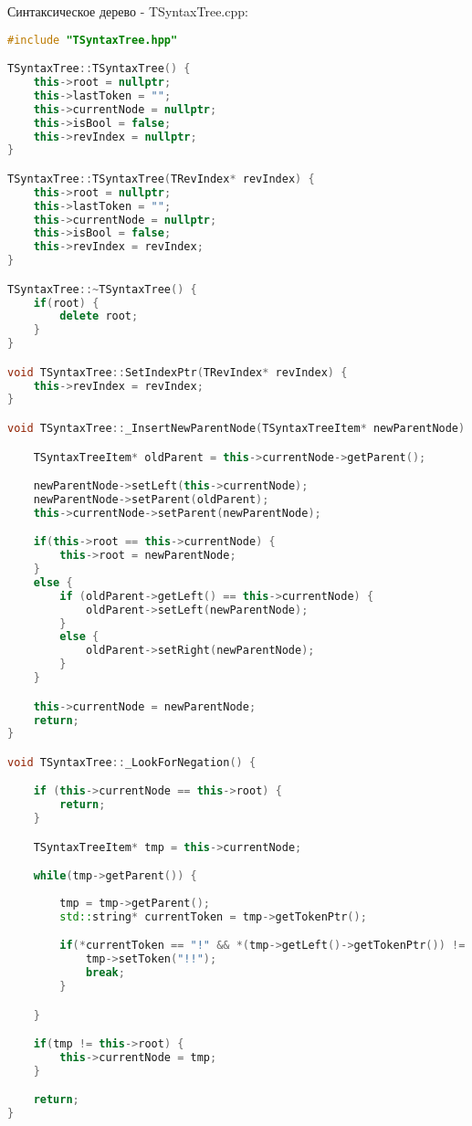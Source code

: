 Синтаксическое дерево - TSyntaxTree.cpp:
\begin{lstlisting}[language=C++]
#include "TSyntaxTree.hpp"

TSyntaxTree::TSyntaxTree() {
    this->root = nullptr;
    this->lastToken = "";
    this->currentNode = nullptr;
    this->isBool = false;
    this->revIndex = nullptr;
}

TSyntaxTree::TSyntaxTree(TRevIndex* revIndex) {
    this->root = nullptr;
    this->lastToken = "";
    this->currentNode = nullptr;
    this->isBool = false;
    this->revIndex = revIndex;
}

TSyntaxTree::~TSyntaxTree() {
    if(root) {
        delete root;
    }
}

void TSyntaxTree::SetIndexPtr(TRevIndex* revIndex) {
    this->revIndex = revIndex;
}

void TSyntaxTree::_InsertNewParentNode(TSyntaxTreeItem* newParentNode) {

    TSyntaxTreeItem* oldParent = this->currentNode->getParent();

    newParentNode->setLeft(this->currentNode);
    newParentNode->setParent(oldParent);
    this->currentNode->setParent(newParentNode);

    if(this->root == this->currentNode) {
        this->root = newParentNode;
    }
    else {
        if (oldParent->getLeft() == this->currentNode) {
            oldParent->setLeft(newParentNode);
        }
        else {
            oldParent->setRight(newParentNode);
        }
    }

    this->currentNode = newParentNode;
    return;
}

void TSyntaxTree::_LookForNegation() {

    if (this->currentNode == this->root) {
        return;
    }

    TSyntaxTreeItem* tmp = this->currentNode;

    while(tmp->getParent()) {
        
        tmp = tmp->getParent();
        std::string* currentToken = tmp->getTokenPtr();

        if(*currentToken == "!" && *(tmp->getLeft()->getTokenPtr()) != "(") {
            tmp->setToken("!!");
            break;
        }

    }

    if(tmp != this->root) {
        this->currentNode = tmp;
    }

    return;
}


\end{lstlisting}
